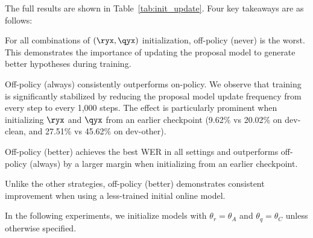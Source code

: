 The full results are shown in Table~\ref{tab:init_update}. 
Four key takeaways are as follows:
\begin{enumerate*}[label=(\arabic*)]
    \item For all combinations of $(\ryx, \qyx)$ initialization, off-policy (never) is the worst. This demonstrates the importance of updating the proposal model to generate better hypotheses during training.
    
    \item Off-policy (always) consistently outperforms on-policy. We observe that training is significantly stabilized by reducing the proposal model update frequency from every step to every 1,000 steps.
    The effect is particularly prominent when initializing $\ryx$ and $\qyx$ from an earlier checkpoint (9.62\% vs 20.02\% on dev-clean, and 27.51\% vs 45.62\% on dev-other).
    
    \item Off-policy (better) achieves the best WER in all settings and outperforms off-policy (always) by a larger margin when initializing from an earlier checkpoint.
    
    \item Unlike the other strategies, off-policy (better) demonstrates consistent improvement when using a less-trained initial online model.
\end{enumerate*}
In the following experiments, we initialize models with $\theta_r = \theta_A$ and $\theta_q = \theta_C$ unless otherwise specified.

